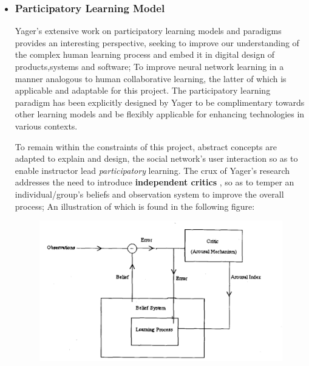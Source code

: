 \begin{itemize}[\null]
    
    \item \subsubsection{Participatory Learning Model}
 
    Yager's \cite{Yager1990,Yager2004,Yager2004a} extensive work on participatory learning models and paradigms provides an interesting perspective, seeking to improve our understanding of the  complex human learning process and embed it in digital design of products,systems and software; To improve neural network learning in a manner analogous to human collaborative learning, the latter of which is applicable and adaptable for this project. The participatory learning paradigm has been explicitly designed by Yager \cite{Yager2004,Yager2004a} to be complimentary towards other learning models and be flexibly applicable for enhancing technologies in various contexts.
    
    To remain within the constraints of this project, abstract concepts are adapted to explain and design, the social network's user interaction so as to enable instructor lead \textit{participatory} learning. The crux of Yager's research addresses the need to introduce \textbf{independent critics} \cite{Yager2004a,Yager2004,Yager1990}, so as to temper an individual/group's beliefs and observation system \cite{Yager1990} to improve the overall  process; An illustration of which is found in the following figure:

\newpage
\begin{figure}[H]
	\centering
	\includegraphics[scale=0.5]{figures/particip}
	\label{fig:Relationship Between Learning Process,Belief System and Critic}
\end{figure}


\end{itemize}
